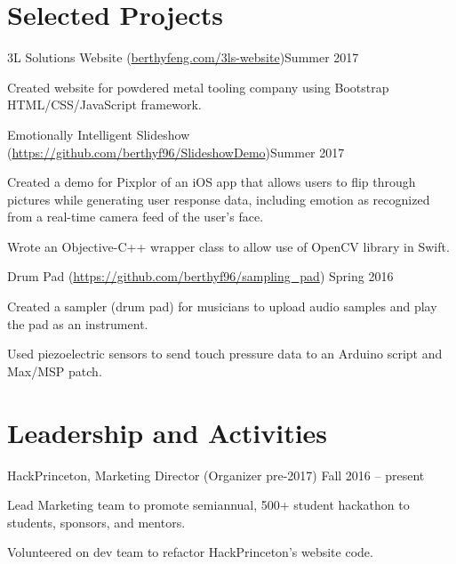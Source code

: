 \documentclass[12pt]{my_resume}
\begin{document}
\section{Selected Projects}

\begin{resitem}{3L Solutions Website %
(\url{berthyfeng.com/3ls-website})}{Summer 2017}
  \item Created website for powdered metal tooling company using %
  Bootstrap HTML/CSS/JavaScript framework.
\end{resitem}

\vspace{-8pt}

\begin{resitem}{Emotionally Intelligent Slideshow %
(\url{https://github.com/berthyf96/SlideshowDemo})}{Summer 2017}
  \item Created a demo for Pixplor of an iOS app that allows users to %
  flip through pictures while generating user response data, including %
  emotion as recognized from a real-time camera feed of the user’s face.
  \item Wrote an Objective-C++ wrapper class to allow use of OpenCV %
  library in Swift.
\end{resitem}

\vspace{-8pt}

\begin{resitem}{Drum Pad (\url{https://github.com/berthyf96/sampling_pad})}%
{Spring 2016}
  \item Created a sampler (drum pad) for musicians to upload audio %
  samples and play the pad as an instrument.
  \item Used piezoelectric sensors to send touch pressure data to an %
  Arduino script and Max/MSP patch.
\end{resitem}

\section{Leadership and Activities}

\begin{resitem}{HackPrinceton, Marketing Director (Organizer pre-2017)}%
{Fall 2016 -- present}
  \item Lead Marketing team to promote semiannual, 500+ student hackathon %
  to students, sponsors, and mentors.
  \item Volunteered on dev team to refactor HackPrinceton’s website code. %
\end{resitem}
\end{document}
